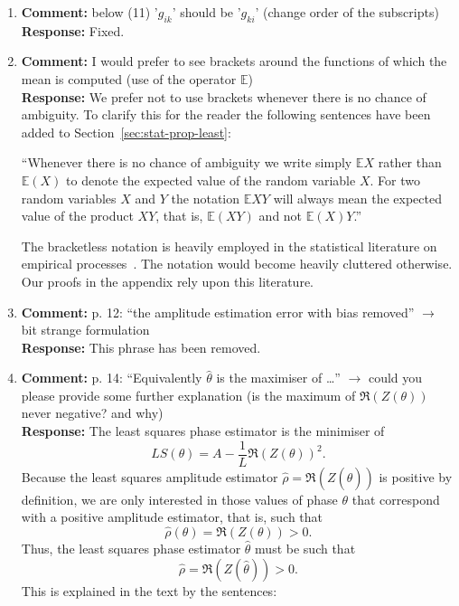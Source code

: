 \documentclass{article}
\newcommand{\expect}{{\mathbb E}}
\begin{document}
\begin{enumerate}
\item \textbf{Comment:} below (11) '$g_{ik}$' should be '$g_{ki}$' (change order of the subscripts) \\
\textbf{Response:} Fixed.

\item \label{rev2:commentE} \textbf{Comment:} I would prefer to see brackets around the functions of which the mean is computed (use of the operator $\mathbb E$) \\
\textbf{Response:} We prefer not to use brackets whenever there is no chance of ambiguity.  To clarify this for the reader the following sentences have been added to Section~\ref{sec:stat-prop-least}:

``Whenever there is no chance of ambiguity we write simply $\expect X$ rather than $\expect(X)$ to denote the expected value of the random variable $X$.  For two random variables $X$ and $Y$ the notation $\expect X Y$ will always mean the expected value of the product $XY$, that is, $\expect(XY)$ and not $\expect(X)Y$.''

The bracketless notation is heavily employed in the statistical literature on empirical processes~\cite{Pollard_new_ways_clts_1986,Pollard_conv_stat_proc_1984,Pollard_asymp_empi_proc_1989,van2009empirical}. The notation would become heavily cluttered otherwise.  Our proofs in the appendix rely upon this literature.

\item \textbf{Comment:} p. 12: ``the amplitude estimation error with bias removed'' $\to$ bit strange formulation \\
\textbf{Response:} This phrase has been removed.

\item \textbf{Comment:} p. 14: ``Equivalently $\hat\theta$ is the maximiser of \dots'' $\to$ could you please provide some further explanation (is the maximum of $\Re(Z(\theta))$ never negative? and why) \\
\textbf{Response:} The least squares phase estimator is the minimiser of
\[
LS(\theta) = A - \frac{1}{L}\Re(Z(\theta))^2.
\]
Because the least squares amplitude estimator $\hat{\rho} = \Re(Z(\hat{\theta}))$ is positive by definition, we are only interested in those values of phase $\theta$ that correspond with a positive amplitude estimator, that is, such that
\[
\hat{\rho}(\theta) = \Re(Z(\theta)) > 0.
\]
Thus, the least squares phase estimator $\hat{\theta}$ must be such that
\[
\hat{\rho} = \Re(Z(\hat{\theta})) > 0.
\]
This is explained in the text by the sentences:


\end{enumerate}
\end{document}
